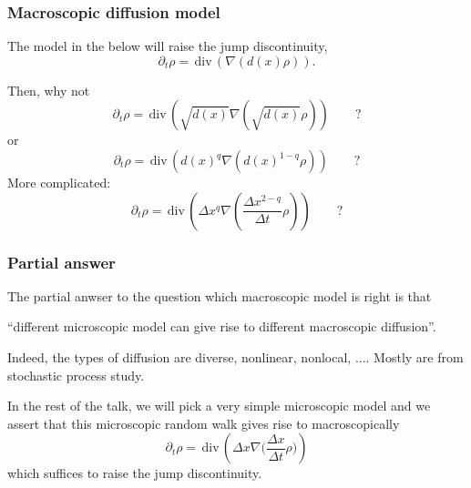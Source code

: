 \documentclass{beamer}
\def\red{\color{red}}
\def\div{\,\textrm{div}\,}
\begin{document}
 \begin{frame}
 \frametitle{Macroscopic diffusion model}
The model in the below will raise the jump discontinuity,
$$ \partial_t \rho = \div (\nabla (d(x) \rho) ).$$\pause

Then, why not 
$$ \partial_t \rho = \div (\sqrt{d(x)}\nabla (\sqrt{d(x)} \rho) ) \quad \quad ?$$
or
$$ \partial_t \rho = \div (d(x)^q\nabla (d(x)^{1-q} \rho) ) \quad \quad ?$$
More complicated:
$$ \partial_t \rho = \div (\Delta x^q\nabla (\frac{\Delta x^{2-q}}{\Delta t} \rho) ) \quad \quad ?$$

 
 \end{frame} 
 
  \begin{frame}
 \frametitle{Partial answer}
The partial anwser to the question which macroscopic model is right is that 

{\red ``different microscopic model can give rise to different macroscopic diffusion''.} \pause

Indeed, the types of diffusion are diverse, nonlinear, nonlocal, .... Mostly are from stochastic process study. \pause

In the rest of the talk, we will pick a very simple microscopic model and we assert that this microscopic random walk gives rise to macroscopically
$$\partial_t \rho = \div (\Delta x \nabla \big( \frac{\Delta x}{\Delta t} \rho\big) )$$
which suffices to raise the jump discontinuity.
 
 \end{frame} 
 
\end{document}
